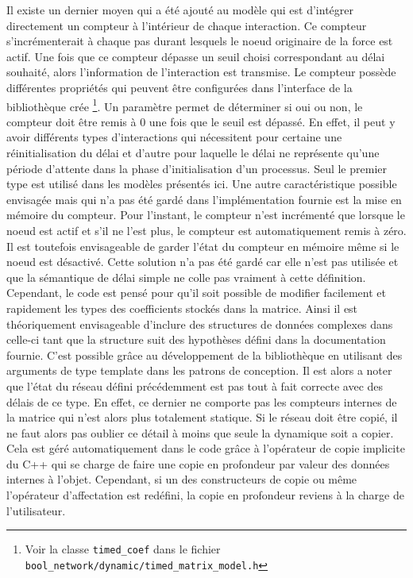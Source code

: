 \documentclass[11pt, a4paper]{article}
\begin{document}
Il existe un dernier moyen qui a été ajouté au modèle qui est d'intégrer
directement un compteur à l'intérieur de chaque interaction. Ce compteur
s'incrémenterait à chaque pas durant lesquels le noeud originaire de la force
est actif. Une fois que ce compteur dépasse un seuil choisi correspondant au
délai souhaité, alors l'information de l'interaction est transmise. Le compteur
possède différentes propriétés qui peuvent être configurées dans l'interface de
la bibliothèque crée \footnote{Voir la classe \texttt{timed\_coef} dans le
fichier \texttt{bool\_network/dynamic/timed\_matrix\_model.h}}.  Un paramètre
permet de déterminer si oui ou non, le compteur doit être remis à $0$ une fois
que le seuil est dépassé. En effet, il peut y avoir différents types
d'interactions qui nécessitent pour certaine une réinitialisation du délai et
d'autre pour laquelle le délai ne représente qu'une période d'attente dans la
phase d'initialisation d'un processus. Seul le premier type est utilisé dans
les modèles pr\'esent\'es ici. Une autre caractéristique possible envisagée mais qui n'a
pas été gardé dans l'implémentation fournie est la mise en mémoire du compteur.
Pour l'instant, le compteur n'est incrémenté que lorsque le noeud est actif et
s'il ne l'est plus, le compteur est automatiquement remis à zéro. Il est
toutefois envisageable de garder l'état du compteur en mémoire même si le noeud
est désactivé. Cette solution n'a pas été gardé car elle n'est pas utilisée et
que la sémantique de délai simple ne colle pas vraiment à cette définition.
Cependant, le code est pensé pour qu'il soit possible de modifier facilement et
rapidement les types des coefficients stockés dans la matrice. Ainsi il est
théoriquement envisageable d'inclure des structures de données complexes dans
celle-ci tant que la structure suit des hypothèses défini dans la documentation
fournie. C'est possible grâce au développement de la bibliothèque en utilisant
des arguments de type template dans les patrons de conception.  Il est alors a
noter que l'état du réseau défini précédemment est pas tout à fait correcte
avec des délais de ce type. En effet, ce dernier ne comporte pas les compteurs
internes de la matrice qui n'est alors plus totalement statique. Si le réseau
doit être copié, il ne faut alors pas oublier ce détail à moins que seule la
dynamique soit a copier. Cela est géré automatiquement dans le code grâce à
l'opérateur de copie implicite du C++ qui se charge de faire une copie en
profondeur par valeur des données internes à l'objet. Cependant, si un des
constructeurs de copie ou même l'opérateur d'affectation est redéfini, la copie
en profondeur reviens à la charge de l'utilisateur.
\end{document}
